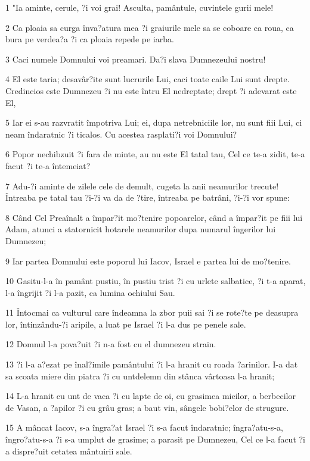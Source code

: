 \par 1 "Ia aminte, cerule, ?i voi grai! Asculta, pamântule, cuvintele gurii mele!
\par 2 Ca ploaia sa curga înva?atura mea ?i graiurile mele sa se coboare ca roua, ca bura pe verdea?a ?i ca ploaia repede pe iarba.
\par 3 Caci numele Domnului voi preamari. Da?i slava Dumnezeului nostru!
\par 4 El este taria; desavâr?ite sunt lucrurile Lui, caci toate caile Lui sunt drepte. Credincios este Dumnezeu ?i nu este întru El nedreptate; drept ?i adevarat este El,
\par 5 Iar ei s-au razvratit împotriva Lui; ei, dupa netrebniciile lor, nu sunt fiii Lui, ci neam îndaratnic ?i ticalos. Cu acestea rasplati?i voi Domnului?
\par 6 Popor nechibzuit ?i fara de minte, au nu este El tatal tau, Cel ce te-a zidit, te-a facut ?i te-a întemeiat?
\par 7 Adu-?i aminte de zilele cele de demult, cugeta la anii neamurilor trecute! Întreaba pe tatal tau ?i-?i va da de ?tire, întreaba pe batrâni, ?i-?i vor spune:
\par 8 Când Cel Preaînalt a împar?it mo?tenire popoarelor, când a împar?it pe fiii lui Adam, atunci a statornicit hotarele neamurilor dupa numarul îngerilor lui Dumnezeu;
\par 9 Iar partea Domnului este poporul lui Iacov, Israel e partea lui de mo?tenire.
\par 10 Gasitu-l-a în pamânt pustiu, în pustiu trist ?i cu urlete salbatice, ?i t-a aparat, l-a îngrijit ?i l-a pazit, ca lumina ochiului Sau.
\par 11 Întocmai ca vulturul care îndeamna la zbor puii sai ?i se rote?te pe deasupra lor, întinzându-?i aripile, a luat pe Israel ?i l-a dus pe penele sale.
\par 12 Domnul l-a pova?uit ?i n-a fost cu el dumnezeu strain.
\par 13 ?i l-a a?ezat pe înal?imile pamântului ?i l-a hranit cu roada ?arinilor. I-a dat sa scoata miere din piatra ?i cu untdelemn din stânca vârtoasa l-a hranit;
\par 14 L-a hranit cu unt de vaca ?i cu lapte de oi, cu grasimea mieilor, a berbecilor de Vasan, a ?apilor ?i cu grâu gras; a baut vin, sângele bobi?elor de strugure.
\par 15 A mâncat Iacov, s-a îngra?at Israel ?i s-a facut îndaratnic; îngra?atu-s-a, îngro?atu-s-a ?i s-a umplut de grasime; a parasit pe Dumnezeu, Cel ce l-a facut ?i a dispre?uit cetatea mântuirii sale.
